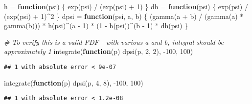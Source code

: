 \documentclass[
]{article}
\newenvironment{Shaded}{\begin{snugshade}}{\end{snugshade}}
\newcommand{\CommentTok}[1]{\textcolor[rgb]{0.56,0.35,0.01}{\textit{#1}}}
\newcommand{\ControlFlowTok}[1]{\textcolor[rgb]{0.13,0.29,0.53}{\textbf{#1}}}
\newcommand{\DecValTok}[1]{\textcolor[rgb]{0.00,0.00,0.81}{#1}}
\newcommand{\FunctionTok}[1]{\textcolor[rgb]{0.00,0.00,0.00}{#1}}
\newcommand{\NormalTok}[1]{#1}
\newcommand{\OtherTok}[1]{\textcolor[rgb]{0.56,0.35,0.01}{#1}}
\newcommand{\SpecialCharTok}[1]{\textcolor[rgb]{0.00,0.00,0.00}{#1}}
\begin{document}
\begin{Shaded}
\begin{Highlighting}[]
\NormalTok{h }\OtherTok{=} \ControlFlowTok{function}\NormalTok{(psi) \{}
  \FunctionTok{exp}\NormalTok{(psi) }\SpecialCharTok{/}\NormalTok{ (}\FunctionTok{exp}\NormalTok{(psi) }\SpecialCharTok{+} \DecValTok{1}\NormalTok{)}
\NormalTok{\}}
\NormalTok{dh }\OtherTok{=} \ControlFlowTok{function}\NormalTok{(psi) \{}
  \FunctionTok{exp}\NormalTok{(psi) }\SpecialCharTok{/}\NormalTok{ (}\FunctionTok{exp}\NormalTok{(psi) }\SpecialCharTok{+} \DecValTok{1}\NormalTok{)}\SpecialCharTok{\^{}}\DecValTok{2}
\NormalTok{\}}
\NormalTok{dpsi }\OtherTok{=} \ControlFlowTok{function}\NormalTok{(psi, a, b) \{}
\NormalTok{  (}\FunctionTok{gamma}\NormalTok{(a }\SpecialCharTok{+}\NormalTok{ b) }\SpecialCharTok{/}\NormalTok{ (}\FunctionTok{gamma}\NormalTok{(a) }\SpecialCharTok{*} \FunctionTok{gamma}\NormalTok{(b))) }\SpecialCharTok{*} \FunctionTok{h}\NormalTok{(psi)}\SpecialCharTok{\^{}}\NormalTok{(a }\SpecialCharTok{{-}} \DecValTok{1}\NormalTok{) }\SpecialCharTok{*}\NormalTok{ (}\DecValTok{1} \SpecialCharTok{{-}} \FunctionTok{h}\NormalTok{(psi))}\SpecialCharTok{\^{}}\NormalTok{(b }\SpecialCharTok{{-}} \DecValTok{1}\NormalTok{) }\SpecialCharTok{*} \FunctionTok{dh}\NormalTok{(psi)}
\NormalTok{\}}

\CommentTok{\# To verify this is a valid PDF {-} with various a and b, integral should be approximately 1}
\FunctionTok{integrate}\NormalTok{(}\ControlFlowTok{function}\NormalTok{(p) }\FunctionTok{dpsi}\NormalTok{(p, }\DecValTok{2}\NormalTok{, }\DecValTok{2}\NormalTok{), }\SpecialCharTok{{-}}\DecValTok{100}\NormalTok{, }\DecValTok{100}\NormalTok{)}
\end{Highlighting}
\end{Shaded}

\begin{verbatim}
## 1 with absolute error < 9e-07
\end{verbatim}

\begin{Shaded}
\begin{Highlighting}[]
\FunctionTok{integrate}\NormalTok{(}\ControlFlowTok{function}\NormalTok{(p) }\FunctionTok{dpsi}\NormalTok{(p, }\DecValTok{4}\NormalTok{, }\DecValTok{8}\NormalTok{), }\SpecialCharTok{{-}}\DecValTok{100}\NormalTok{, }\DecValTok{100}\NormalTok{)}
\end{Highlighting}
\end{Shaded}

\begin{verbatim}
## 1 with absolute error < 1.2e-08
\end{verbatim}
\end{document}
